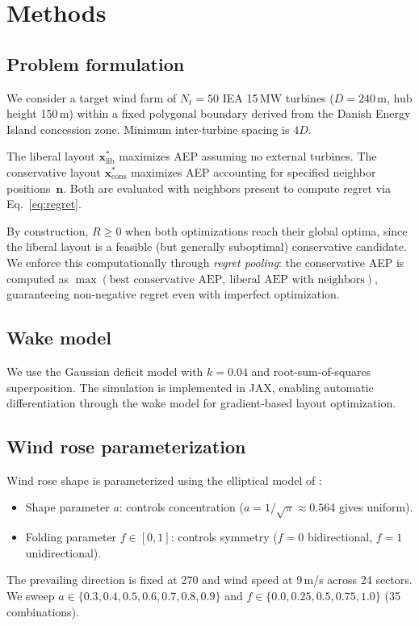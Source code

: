 \documentclass[manuscript, 12pt]{copernicus}
\begin{document}
\section{Methods}\label{sec:methods}

\subsection{Problem formulation}

We consider a target wind farm of $N_t = 50$ IEA 15\,MW turbines ($D = 240$\,m, hub height 150\,m) within a fixed polygonal boundary derived from the Danish Energy Island concession zone.
Minimum inter-turbine spacing is $4D$.

The liberal layout $\mathbf{x}^*_\text{lib}$ maximizes AEP assuming no external turbines.
The conservative layout $\mathbf{x}^*_\text{cons}$ maximizes AEP accounting for specified neighbor positions~$\mathbf{n}$.
Both are evaluated with neighbors present to compute regret via Eq.~\eqref{eq:regret}.

By construction, $R \geq 0$ when both optimizations reach their global optima, since the liberal layout is a feasible (but generally suboptimal) conservative candidate.
We enforce this computationally through \emph{regret pooling}: the conservative AEP is computed as $\max(\text{best conservative AEP},\ \text{liberal AEP with neighbors})$, guaranteeing non-negative regret even with imperfect optimization.

\subsection{Wake model}

We use the \citet{Bastankhah2014} Gaussian deficit model with $k = 0.04$ and root-sum-of-squares superposition.
The simulation is implemented in JAX, enabling automatic differentiation through the wake model for gradient-based layout optimization.

\subsection{Wind rose parameterization}

Wind rose shape is parameterized using the elliptical model of \citet{Hart2025}:
\begin{itemize}
    \item Shape parameter $a$: controls concentration ($a = 1/\sqrt{\pi} \approx 0.564$ gives uniform).
    \item Folding parameter $f \in [0,1]$: controls symmetry ($f = 0$ bidirectional, $f = 1$ unidirectional).
\end{itemize}
The prevailing direction is fixed at 270\textdegree{} and wind speed at 9\,m/s across 24 sectors.
We sweep $a \in \{0.3, 0.4, 0.5, 0.6, 0.7, 0.8, 0.9\}$ and $f \in \{0.0, 0.25, 0.5, 0.75, 1.0\}$ (35 combinations).
\end{document}
